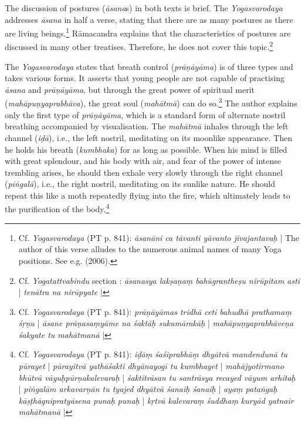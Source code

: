The discussion of postures (\textit{āsana}s) in both texts is brief. The \emph{Yogasvarodaya} addresses \textit{āsana} in half a verse, stating that there are as many postures as there are living beings.\footnote{Cf. \textit{Yogasvarodaya} (PT p. 841): \textit{āsanāni ca tāvanti yāvanto jīvajantavaḥ} | The author of this verse alludes to the numerous animal names of many Yoga positions. See e.g. \citeauthor{encyclopediaasana} (2006).} Rāmacandra explains that the characteristics of postures are discussed in many other treatises. Therefore, he does not cover this topic.\footnote{Cf. \textit{Yogatattvabindu} section : \textit{āsanasya lakṣaṇaṃ bahūgrantheṣu nirūpitam asti} | \textit{tenātra na nirūpyate} |}

The \textit{Yogasvarodaya} states that breath control (\textit{prāṇāyāma}) is of three types and takes various forms. It asserts that young people are not capable of practising \textit{āsana} and \textit{prāṇāyāma}, but through the great power of spiritual merit (\textit{mahāpuṇyaprabhāva}), the great soul (\textit{mahātmā}) can do so.\footnote{Cf. \textit{Yogasvarodaya} (PT p. 841): \textit{prāṇāyāmas tridhā ceti bahudhā prathamaṃ śṛṇu} | \textit{āsane prāṇasaṃyāme na śaktāḥ sukumārakāḥ} | \textit{mahāpuṇyaprabhāveṇa śakyate tu mahātmanā} |} The author explains only the first type of \textit{prāṇāyāma}, which is a standard form of alternate nostril breathing accompanied by visualisation. The \textit{mahātmā} inhales through the left channel (\textit{iḍā}), i.e., the left nostril, meditating on its moonlike appearance. Then he holds his breath (\textit{kumbhaka}) for as long as possible. When his mind is filled with great splendour, and his body with air, and fear of the power of intense trembling arises, he should then exhale very slowly through the right channel (\textit{piṅgalā}), i.e., the right nostril, meditating on its sunlike nature. He should repeat this like a moth repeatedly flying into the fire, which ultimately leads to the purification of the body.\footnote{Cf. \textit{Yogasvarodaya} (PT p. 841): \textit{iḍāṃ śaśiprabhāṃ dhyātvā mandendunā tu pūrayet} | \textit{pūrayitvā yathāśakti dhyānayogī tu kumbhayet} | \textit{mahājyotirmano bhūtvā vāyuḥpūrṇakalevaraḥ} | \textit{śaktitrāsan tu santrāsya recayed vāyum arhitaḥ} | \textit{piṅgalām arkavarṇān tu tyajed dhyātvā śanaiḥ śanaiḥ} | \textit{ayaṃ pataṅgaḥ kāṣṭhāgnipratyāsena punaḥ punaḥ} | \textit{kṛtvā kalevaraṃ śuddhaṃ kuryād yatnair mahātmanā} |}


